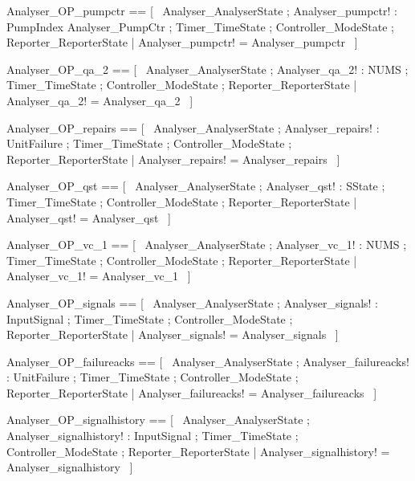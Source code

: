 \documentclass{article}
\begin{document}
\begin{zed}
	Analyser\_OP\_pumpctr == [~  \Xi Analyser\_AnalyserState ; Analyser\_pumpctr! : PumpIndex \fun Analyser\_PumpCtr ; \Xi Timer\_TimeState ; \Xi Controller\_ModeState ; \Xi Reporter\_ReporterState | Analyser\_pumpctr! = Analyser\_pumpctr  ~]
\end{zed}

\begin{zed}
	Analyser\_OP\_qa\_2 == [~  \Xi Analyser\_AnalyserState ; Analyser\_qa\_2! : NUMS ; \Xi Timer\_TimeState ; \Xi Controller\_ModeState ; \Xi Reporter\_ReporterState | Analyser\_qa\_2! = Analyser\_qa\_2  ~]
\end{zed}

\begin{zed}
	Analyser\_OP\_repairs == [~  \Xi Analyser\_AnalyserState ; Analyser\_repairs! : \power UnitFailure ; \Xi Timer\_TimeState ; \Xi Controller\_ModeState ; \Xi Reporter\_ReporterState | Analyser\_repairs! = Analyser\_repairs  ~]
\end{zed}

\begin{zed}
	Analyser\_OP\_qst == [~  \Xi Analyser\_AnalyserState ; Analyser\_qst! : SState ; \Xi Timer\_TimeState ; \Xi Controller\_ModeState ; \Xi Reporter\_ReporterState | Analyser\_qst! = Analyser\_qst  ~]
\end{zed}

\begin{zed}
	Analyser\_OP\_vc\_1 == [~  \Xi Analyser\_AnalyserState ; Analyser\_vc\_1! : NUMS ; \Xi Timer\_TimeState ; \Xi Controller\_ModeState ; \Xi Reporter\_ReporterState | Analyser\_vc\_1! = Analyser\_vc\_1  ~]
\end{zed}

\begin{zed}
	Analyser\_OP\_signals == [~  \Xi Analyser\_AnalyserState ; Analyser\_signals! : \power InputSignal ; \Xi Timer\_TimeState ; \Xi Controller\_ModeState ; \Xi Reporter\_ReporterState | Analyser\_signals! = Analyser\_signals  ~]
\end{zed}

\begin{zed}
	Analyser\_OP\_failureacks == [~  \Xi Analyser\_AnalyserState ; Analyser\_failureacks! : \power UnitFailure ; \Xi Timer\_TimeState ; \Xi Controller\_ModeState ; \Xi Reporter\_ReporterState | Analyser\_failureacks! = Analyser\_failureacks  ~]
\end{zed}

\begin{zed}
	Analyser\_OP\_signalhistory == [~  \Xi Analyser\_AnalyserState ; Analyser\_signalhistory! : \power InputSignal ; \Xi Timer\_TimeState ; \Xi Controller\_ModeState ; \Xi Reporter\_ReporterState | Analyser\_signalhistory! = Analyser\_signalhistory  ~]
\end{zed}
\end{document}
